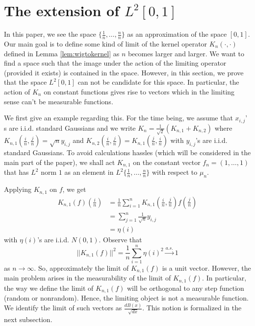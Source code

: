 \documentclass[reqno,12pt]{amsart}
\theoremstyle{plain}
\theoremstyle{definition}
\begin{document}
\section{The extension of $L^{2}[0,1]$}\label{sec:nonmeasure}
In this paper, we see the space $\{\frac{1}{n},\ldots, \frac{n}{n}  \}$ as an approximation of the space $[0,1]$.  
Our main goal is to define  some kind of limit of the kernel operator $K_{n}(\cdot,\cdot)$ defined in Lemma \ref{lem:wigtokernel} as $n$ becomes larger and larger. We want to find a space such that the image under the action of the limiting operator (provided it exists) is contained in the space. However, in this section, we prove that the space $L^{2}[0,1]$ can not be candidate for this space. In particular, the action of $K_{n}$ on constant functions gives rise to vectors which in the limiting sense can't be measurable functions.

We first give an example regarding this. For the time being, we assume that $x_{i,j}$' s are i.i.d. standard Gaussians and we write $K_{n}= \frac{1}{\sqrt{2}}\left(K_{n,1}+ K_{n,2}\right)$ where $K_{n,1}\left(\frac{i}{n}, \frac{j}{n}\right)= \sqrt{n} y_{i,j}$ and $K_{n,2}\left(\frac{i}{n}, \frac{j}{n}\right)= K_{n,1}\left( \frac{j}{n}, \frac{i}{n} \right)$ with $y_{i,j}$'s are i.i.d. standard Gaussians. To avoid calculations hassles (which will be considered in the main part of the paper), we shall act $K_{n,1}$ on the constant vector $f_{n}=(1,\ldots,1)$ that has $L^2$ norm $1$ as an element in $L^2\{\frac{1}{n},\ldots, \frac{n}{n} \}$ with respect to $\mu_{n}$.

Applying $K_{n,1}$ on $f$, we get 
\begin{equation}
\begin{split}
K_{n,1}(f)\left( \frac{i}{n} \right)&= \frac{1}{n} \sum_{i=1}^{n} K_{n,1}\left(\frac{i}{n}, \frac{j}{n}\right)f\left( \frac{j}{n} \right)\\
&= \sum_{j=1}^{n}\frac{1}{\sqrt{n}} y_{i,j}\\
&= \eta(i)
\end{split}
\end{equation}
with $\eta(i)$'s are i.i.d. $N(0,1)$. Observe that 
\[
||K_{n,1}(f) ||^2= \frac{1}{n}\sum_{i=1}^{n} \eta(i)^2 \stackrel{a.s.}{\to} 1 
\]
as $n \to \infty$. So, approximately the limit of $K_{n,1}(f)$ is a unit vector. However, the main problem arises in the measurability of the limit of $K_{n,1}(f)$. In particular, the way we define the limit of $K_{n,1}(f)$ will be orthogonal to any step function (random or nonrandom). Hence, the limiting object is not a measurable function. We identify the limit of such vectors as $\frac{dB(x)}{\sqrt{dx}}$. This notion is formalized in the next subsection.
\end{document}
